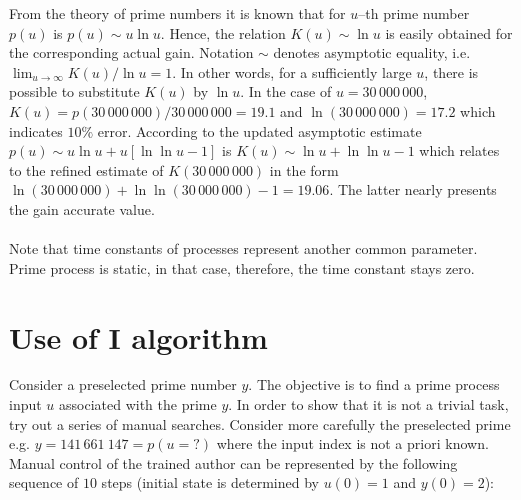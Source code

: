 \documentclass[12pt,a4paper,twoside]{article}
\begin{document}
\vspace{0.3cm}\noindent From the theory of prime numbers it is known \cite{cogu} that for $u$--th prime number $p (u)$ is $p(u) \sim u\ln u$. Hence, the relation $K(u) \sim \ln u$ is easily obtained for the corresponding actual gain. Notation $\sim$ denotes asymptotic equality, i.e. $\lim_ {u \rightarrow \infty} K (u) / \ln u = 1$. In other words, for a sufficiently large $u$, there is possible to substitute $K (u)$ by $\ln u $. In the case of $u = 30 \, 000 \, 000$, $ K (u) = p (30 \, 000 \, 000) / 30 \, 000 \, 000 = 19.1$ and $ \ln (30 \, 000 \, 000) = 17.2$ which indicates $10\%$ error. According to the updated asymptotic estimate $ p (u) \sim u  \ln u + u [\ln \ln u-1] $ is $ K (u) \sim \ln u + \ln \ln u  -1$ which relates to the refined estimate of $ K (30 \, 000 \, 000) $ in the form $ \ln (30 \, 000 \, 000) + \ln \ln (30 \, 000 \, 000) -1 = 19.06$. The latter nearly presents the gain accurate value.  \\  
\\
Note that time constants of processes represent another common parameter. Prime process is static, in that case, therefore, the time constant stays zero.

\section{Use of I algorithm}   

\vspace{0.3cm}\noindent Consider a preselected prime number $y$. The objective is to find a prime process input $u$ associated with the prime $y$. In order to show that it is not a trivial task, try out a series of manual searches. Consider more carefully the preselected prime e.g. $ y = 141 \, 661 \ 147 = p (u=?)$ where the input index is not a priori known. Manual control of the trained author can be represented by the following sequence of $10$ steps (initial state is determined by $ u (0) = 1 $ and $ y (0) = 2 $): 
\end{document}
